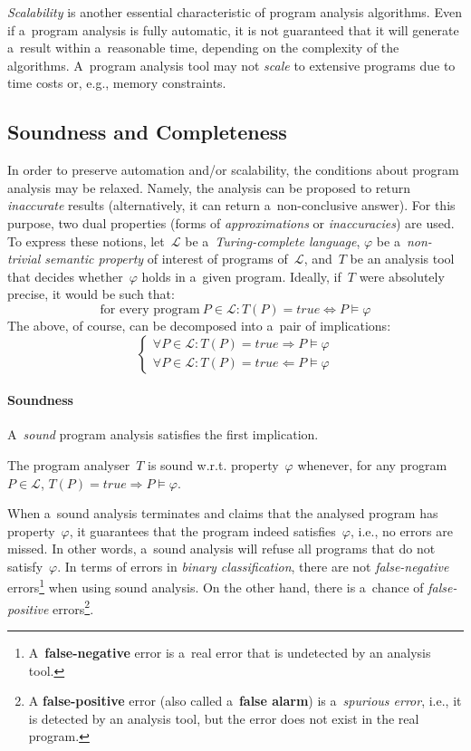 \emph{Scalability} is another essential characteristic of program analysis algorithms. Even if a~program analysis is fully automatic, it is not guaranteed that it will generate a~result within a~reasonable time, depending on the complexity of the algorithms. A~program analysis tool may not \emph{scale} to extensive programs due to time costs or, e.g., memory constraints.

\subsection{Soundness and Completeness}

In order to preserve automation and/or scalability, the conditions about program analysis may be relaxed. Namely, the analysis can be proposed to return \emph{inaccurate} results (alternatively, it can return a~non-conclusive  answer). For this purpose, two dual properties (forms of \emph{approximations} or \emph{inaccuracies}) are used. To express these notions, let~$ \mathcal{L} $ be a~\emph{Turing-complete language}, $ \varphi $ be a~\emph{non-trivial semantic property} of interest of programs of~$ \mathcal{L} $, and~$ T $ be an analysis tool that decides whether~$ \varphi $ holds in a~given program. Ideally, if~$ T $ were absolutely precise, it would be such that:
$$
    \text{for every program}\ P \in \mathcal{L}: T(P) = true \Longleftrightarrow P \models \varphi
$$
The above, of course, can be decomposed into a~pair of implications:
$$
    \begin{cases}
        \forall P \in \mathcal{L}: T(P) = true \Longrightarrow P \models \varphi \\
        \forall P \in \mathcal{L}: T(P) = true \Longleftarrow P \models \varphi
    \end{cases}
$$

\paragraph{Soundness}
A~\emph{sound} program analysis satisfies the first implication.
\begin{definition}
    The program analyser~$ T $ is sound w.r.t. property~$ \varphi $ whenever, for any program $ P \in \mathcal{L} $, $ T(P) = true \Longrightarrow P \models \varphi $.
\end{definition}
When a~sound analysis terminates and claims that the analysed program has property~$ \varphi $, it guarantees that the program indeed satisfies~$ \varphi $, i.e., no errors are missed. In other words, a~sound analysis will refuse all programs that do not satisfy~$ \varphi $. In terms of errors in \emph{binary classification}, there are not \emph{false-negative} errors\footnote{A~\textbf{false-negative} error is a~real error that is undetected by an analysis tool.} when using sound analysis. On the other hand, there is a~chance of \emph{false-positive} errors\footnote{A \textbf{false-positive} error (also called a~\textbf{false alarm}) is a~\emph{spurious error}, i.e., it is detected by an analysis tool, but the error does not exist in the real program.}.

